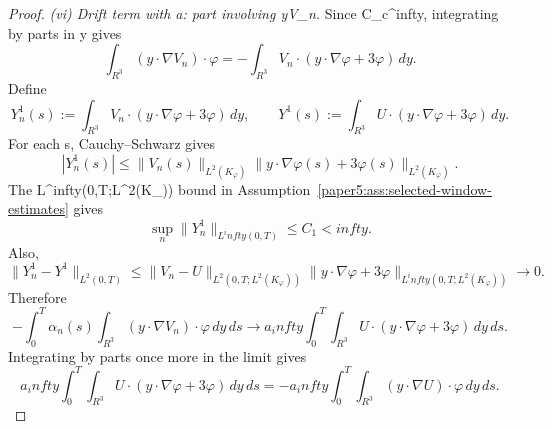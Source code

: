 \documentclass[11pt]{amsart}
\def\({}%
\def\){}%
\def\mathbb#1{#1}%
\def\infty{infty}%
\theoremstyle{plain}
\theoremstyle{definition}
\theoremstyle{remark}
\begin{document}
\begin{proof}
\medskip
\noindent\textit{(vi) Drift term with \(a\): part involving \(y\cdot\nabla V_n\).}
Since \(\varphi\in C_c^\infty\), integrating by parts in \(y\) gives
\[
  \int_{\mathbb R^3}(y\cdot\nabla V_n)\cdot\varphi
  =-\int_{\mathbb R^3}V_n\cdot(y\cdot\nabla\varphi+3\varphi)
  \,dy.
\]
Define
\[
  Y_n^1(s):=\int_{\mathbb R^3}V_n\cdot(y\cdot\nabla\varphi+3\varphi)
  \,dy,
  \qquad
  Y^1(s):=\int_{\mathbb R^3}U\cdot(y\cdot\nabla\varphi+3\varphi)
  \,dy.
\]
For each \(s\), Cauchy--Schwarz gives
\[
  |Y_n^1(s)|
  \le
  \|V_n(s)\|_{L^2(K_\varphi)}
  \|y\cdot\nabla\varphi(s)+3\varphi(s)\|_{L^2(K_\varphi)}.
\]
The \(L^\infty(0,T;L^2(K_\varphi))\) bound in
Assumption~\ref{paper5:ass:selected-window-estimates} gives
\[
  \sup_n\|Y_n^1\|_{L^\infty(0,T)}\le C_1<\infty.
\]
Also,
\[
  \|Y_n^1-Y^1\|_{L^2(0,T)}
  \le
  \|V_n-U\|_{L^2(0,T;L^2(K_\varphi))}
  \|y\cdot\nabla\varphi+3\varphi\|_{L^\infty(0,T;L^2(K_\varphi))}
  \to0.
\]
Therefore
\[
  -\int_0^T\alpha_n(s)
  \int_{\mathbb R^3}(y\cdot\nabla V_n)\cdot\varphi
  \,dy\,ds
  \to
  a_\infty\int_0^T\!\int_{\mathbb R^3}U\cdot(y\cdot\nabla\varphi+3\varphi)
  \,dy\,ds.
\]
Integrating by parts once more in the limit gives
\[
  a_\infty\int_0^T\!\int_{\mathbb R^3}U\cdot(y\cdot\nabla\varphi+3\varphi)
  \,dy\,ds
  =
  -a_\infty\int_0^T\!\int_{\mathbb R^3}(y\cdot\nabla U)\cdot\varphi
  \,dy\,ds.
\]


\end{proof}
\end{document}
